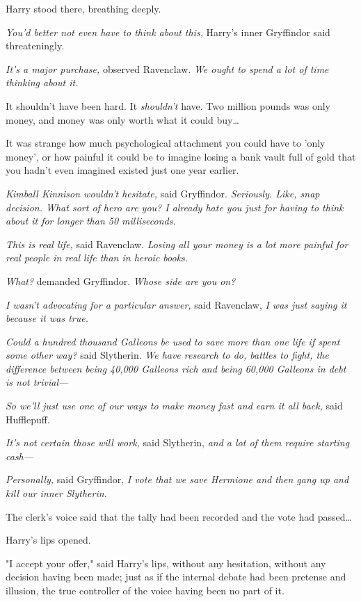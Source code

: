 Harry stood there, breathing deeply.

\emph{You'd better not even have to think about this,} Harry's inner Gryffindor 
said threateningly.

\emph{It's a major purchase,} observed Ravenclaw. \emph{We ought to spend a lot 
of time thinking about it.}

It shouldn't have been hard. It \emph{shouldn't} have. Two million pounds was 
only money, and money was only worth what it could buy{\ldots}

It was strange how much psychological attachment you could have to 'only 
money', or how painful it could be to imagine losing a bank vault full of gold 
that you hadn't even imagined existed just one year earlier.

\emph{Kimball Kinnison wouldn't hesitate,} said Gryffindor. \emph{Seriously. 
Like, snap decision. What sort of hero are you? I already hate you just for 
having to think about it for longer than 50 milliseconds.}

\emph{This is real life,} said Ravenclaw. \emph{Losing all your money is a lot 
more painful for real people in real life than in heroic books.}

\emph{What?} demanded Gryffindor. \emph{Whose side are you on?}

\emph{I wasn't advocating for a particular answer,} said Ravenclaw, \emph{I was 
just saying it because it was true.}

\emph{Could a hundred thousand Galleons be used to save more than one life if 
spent some other way?} said Slytherin. \emph{We have research to do, battles to 
fight, the difference between being 40,000 Galleons rich and being 60,000 
Galleons in debt is not trivial---}

\emph{So we'll just use one of our ways to make money fast and earn it all 
back,} said Hufflepuff.

\emph{It's not certain those will work,} said Slytherin, \emph{and a lot of 
them require starting cash---}

\emph{Personally,} said Gryffindor,\emph{ I vote that we save Hermione and then 
gang up and kill our inner Slytherin.}

The clerk's voice said that the tally had been recorded and the vote had 
passed{\ldots}

Harry's lips opened.

"I accept your offer," said Harry's lips, without any hesitation, without any 
decision having been made; just as if the internal debate had been pretense and 
illusion, the true controller of the voice having been no part of it.

